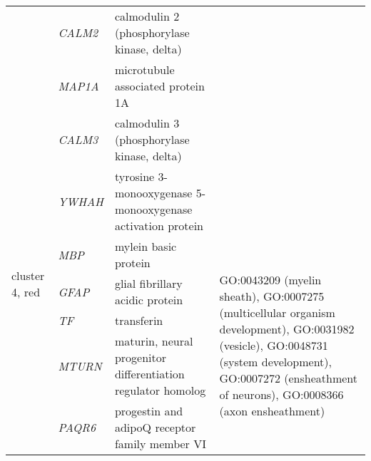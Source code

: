 \begin{table}[htp]
\begin{center}
\begin{tabular}{|p{0.7in}|p{0.7in}|p{2in}|p{3in}|}
			& \small{\textit{CALM2}} & \footnotesize{calmodulin 2 (phosphorylase kinase, delta)} & \\
			& \small{\textit{MAP1A}} & \footnotesize{microtubule associated protein 1A} &\\
			&  \small{\textit{CALM3}} & \footnotesize{calmodulin 3 (phosphorylase kinase, delta)} & \\
			& \small{\textit{YWHAH}} & \footnotesize{tyrosine 3-monooxygenase  5-monooxygenase activation protein} & \\
\hline
 \multirow{3}{4em}{\small{cluster 4, red}} & \small{\textit{MBP}} & \footnotesize{mylein basic protein} & \multirow{6}{16em}{\footnotesize{GO:0043209 (myelin sheath), GO:0007275 (multicellular organism development), GO:0031982 (vesicle), GO:0048731 (system development), GO:0007272 (ensheathment of neurons), GO:0008366 (axon ensheathment)}} \\
 			& \small{\textit{GFAP}} & \footnotesize{glial fibrillary acidic protein} & \\
			& \small{\textit{TF}} & \footnotesize{transferin} & \\
			& \small{\textit{MTURN}} & \footnotesize{maturin, neural progenitor differentiation regulator homolog } & \\
			& \small{\textit{PAQR6}} & \footnotesize{progestin and adipoQ receptor family member VI} & \\
\hline	
\end{tabular}
\end{center}
 \end{table}


